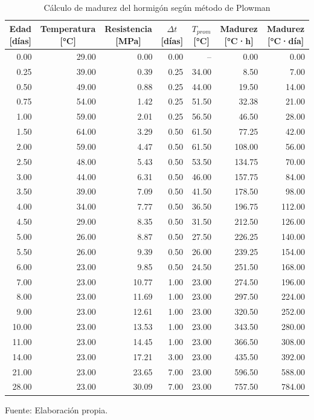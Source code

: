 \begin{table}[H]
\centering
\renewcommand{\arraystretch}{1.15}
\caption{Cálculo de madurez del hormigón según método de Plowman}
\begin{tabular}{r r r r r r r }
\hline
\multicolumn{1}{c}{Edad [días]} & \multicolumn{1}{c}{Temperatura [°C]} & \multicolumn{1}{c}{Resistencia [MPa]} & \multicolumn{1}{c}{$\Delta t$ [días]} & \multicolumn{1}{c}{$T_{prom}$ [°C]} & \multicolumn{1}{c}{Madurez [°C·h]} & \multicolumn{1}{c}{Madurez [°C·día]} \\
\hline
0.00 & 29.00 & 0.00 & 0.00 & -- & 0.00 & 0.00\\
0.25 & 39.00 & 0.39 & 0.25 & 34.00 & 8.50 & 7.00 \\
0.50 & 49.00 & 0.88 & 0.25 & 44.00 & 19.50 & 14.00 \\
0.75 & 54.00 & 1.42 & 0.25 & 51.50 & 32.38 & 21.00 \\
1.00 & 59.00 & 2.01 & 0.25 & 56.50 & 46.50 & 28.00 \\
1.50 & 64.00 & 3.29 & 0.50 & 61.50 & 77.25 & 42.00  \\
2.00 & 59.00 & 4.47 & 0.50 & 61.50 & 108.00 & 56.00  \\
2.50 & 48.00 & 5.43 & 0.50 & 53.50 & 134.75 & 70.00  \\
3.00 & 44.00 & 6.31 & 0.50 & 46.00 & 157.75 & 84.00  \\
3.50 & 39.00 & 7.09 & 0.50 & 41.50 & 178.50 & 98.00  \\
4.00 & 34.00 & 7.77 & 0.50 & 36.50 & 196.75 & 112.00  \\
4.50 & 29.00 & 8.35 & 0.50 & 31.50 & 212.50 & 126.00  \\
5.00 & 26.00 & 8.87 & 0.50 & 27.50 & 226.25 & 140.00  \\
5.50 & 26.00 & 9.39 & 0.50 & 26.00 & 239.25 & 154.00  \\
6.00 & 23.00 & 9.85 & 0.50 & 24.50 & 251.50 & 168.00  \\
7.00 & 23.00 & 10.77 & 1.00 & 23.00 & 274.50 & 196.00  \\
8.00 & 23.00 & 11.69 & 1.00 & 23.00 & 297.50 & 224.00  \\
9.00 & 23.00 & 12.61 & 1.00 & 23.00 & 320.50 & 252.00  \\
10.00 & 23.00 & 13.53 & 1.00 & 23.00 & 343.50 & 280.00  \\
11.00 & 23.00 & 14.45 & 1.00 & 23.00 & 366.50 & 308.00  \\
14.00 & 23.00 & 17.21 & 3.00 & 23.00 & 435.50 & 392.00  \\
21.00 & 23.00 & 23.65 & 7.00 & 23.00 & 596.50 & 588.00  \\
28.00 & 23.00 & 30.09 & 7.00 & 23.00 & 757.50 & 784.00  \\
\hline
\end{tabular}
Fuente: Elaboración propia.
\end{table}

